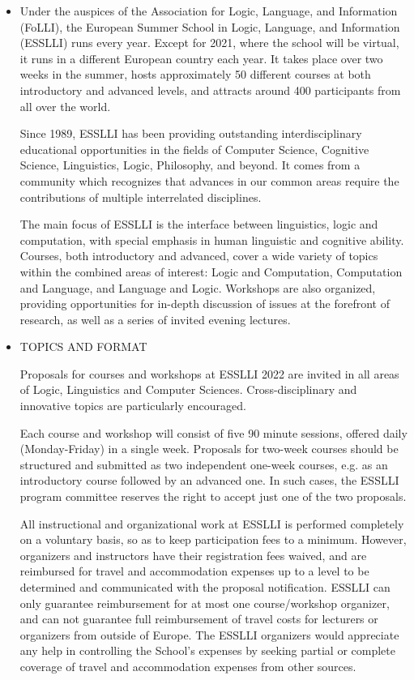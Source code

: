 \documentclass[prodmode,acmtecs]{acmsmall} %
\begin{document}
\begin{itemize}\item  Under the auspices of the Association for Logic, Language, and Information (FoLLI), the European Summer School in Logic, Language, and Information (ESSLLI) runs every year. Except for 2021, where the school will be virtual, it runs in a different European country each year. It takes place over two weeks in the summer, hosts approximately 50 different courses at both introductory and advanced levels, and attracts around 400 participants from all over the world. 
 
  Since 1989, ESSLLI has been providing outstanding interdisciplinary educational opportunities in the fields of Computer Science, Cognitive Science, Linguistics, Logic, Philosophy, and beyond. It comes from a community which recognizes that advances in our common areas require the contributions of multiple interrelated disciplines. 
 
  The main focus of ESSLLI is the interface between linguistics, logic and computation, with special emphasis in human linguistic and cognitive ability. Courses, both introductory and advanced, cover a wide variety of topics within the combined areas of interest: Logic and Computation, Computation and Language, and Language and Logic. Workshops are also organized, providing opportunities for in-depth discussion of issues at the forefront of research, as well as a series of invited evening lectures. 
 
\item  TOPICS AND FORMAT  
 
  Proposals for courses and workshops at ESSLLI 2022 are invited in all areas of Logic, Linguistics and Computer Sciences. Cross-disciplinary and innovative topics are particularly encouraged. 
 
  Each course and workshop will consist of five 90 minute sessions, offered daily (Monday-Friday) in a single week. Proposals for two-week courses should be structured and submitted as two independent one-week courses, e.g. as an introductory course followed by an advanced one. In such cases, the ESSLLI program committee reserves the right to accept just one of the two proposals. 
 
  All instructional and organizational work at ESSLLI is performed completely on a voluntary basis, so as to keep participation fees to a minimum. However, organizers and instructors have their registration fees waived, and are reimbursed for travel and accommodation expenses up to a level to be determined and communicated with the proposal notification. ESSLLI can only guarantee reimbursement for at most one course/workshop organizer, and can not guarantee full reimbursement of travel costs for lecturers or organizers from outside of Europe. The ESSLLI organizers would appreciate any help in controlling the School's expenses by seeking partial or complete coverage of travel and accommodation expenses from other sources. 
 

\end{itemize}
\end{document}
